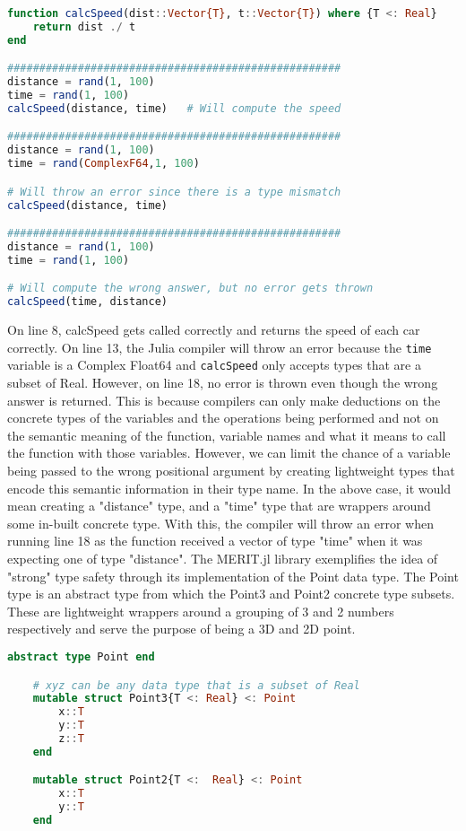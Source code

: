 \begin{lstlisting}[language=Julia]
function calcSpeed(dist::Vector{T}, t::Vector{T}) where {T <: Real}
    return dist ./ t
end

#################################################### 
distance = rand(1, 100)
time = rand(1, 100)
calcSpeed(distance, time)   # Will compute the speed

#################################################### 
distance = rand(1, 100)
time = rand(ComplexF64,1, 100)

# Will throw an error since there is a type mismatch
calcSpeed(distance, time)  

#################################################### 
distance = rand(1, 100)
time = rand(1, 100)

# Will compute the wrong answer, but no error gets thrown
calcSpeed(time, distance) 
\end{lstlisting}
On line 8, calcSpeed gets called correctly and returns the speed of each car correctly. On line 13, the Julia compiler
will throw an error because the \lstinline[language=Julia]{time} variable is a Complex Float64 and
\lstinline[language=Julia]{calcSpeed} only accepts types that are a subset of Real. However, on line 18, no error is
thrown even though the wrong answer is returned. This is because compilers can only make deductions on the concrete
types of the variables and the operations being performed and not on the semantic meaning of the function, variable
names and what it means to call the function with those variables. However, we can limit the chance of a variable being
passed to the wrong positional argument by creating lightweight types that encode this semantic information in their
type name. In the above case, it would mean creating a "distance" type, and a "time" type that are wrappers around some
in-built concrete type. With this, the compiler will throw an error when running line 18 as the function received a
vector of type "time" when it was expecting one of type "distance". \hfill \break
The MERIT.jl library exemplifies the idea of "strong" type safety through its implementation of the Point
data type. The Point type is an abstract type from which the Point3 and Point2 concrete type subsets. These are
lightweight wrappers around a grouping of 3 and 2 numbers respectively and serve the purpose of being a 3D and 2D point.
\begin{lstlisting}[language=Julia]
    abstract type Point end

    # xyz can be any data type that is a subset of Real
    mutable struct Point3{T <: Real} <: Point
        x::T
        y::T
        z::T 
    end

    mutable struct Point2{T <:  Real} <: Point
        x::T
        y::T
    end
\end{lstlisting}

